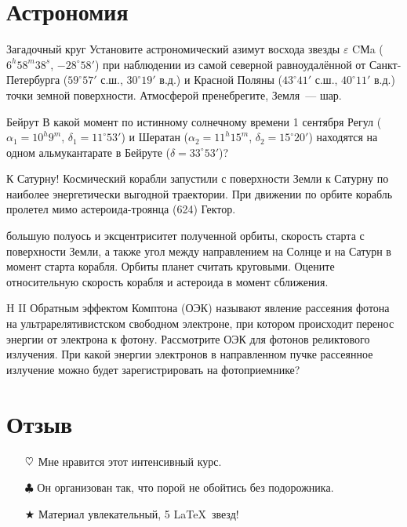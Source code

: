 \documentclass[11pt]{article}
\newcommand{\heart}{\ensuremath\heartsuit}
\begin{document}
\section{Астрономия}
\begin{astro}{Загадочный круг}
Установите астрономический азимут восхода звезды $\varepsilon$ CМa ($6^h58^m38^s$, $-28^\circ58'$) при наблюдении из самой северной равноудалённой от Санкт-Петербурга ($59^\circ57'$ с.ш., $30^\circ19'$ в.д.) и Красной Поляны ($43^\circ41'$ с.ш., $40^\circ11'$ в.д.) точки земной поверхности. Атмосферой пренебрегите, Земля~--- шар.
\end{astro}
\begin{astro}{Бейрут}
В какой момент по истинному солнечному времени 1 сентября Регул ($\alpha_1 = 10^h9^m$, $\delta_1 = 11^\circ53'$) и Шератан ($\alpha_2 = 11^h15^m$, $\delta_2 = 15^\circ20'$) находятся на одном альмукантарате в Бейруте ($\delta = 33^\circ53'$)?
\\
\end{astro}
\begin{astro}{К Сатурну!}
Космический корабли запустили с поверхности Земли к Сатурну по наиболее энергетически выгодной траектории. При движении по орбите корабль пролетел мимо астероида-троянца (624) Гектор.

 большую полуось и эксцентриситет полученной орбиты, скорость старта с поверхности Земли, а также угол между направлением на Солнце и на Сатурн в момент старта корабля. Орбиты планет считать круговыми. Оцените относительную скорость корабля и астероида в момент сближения.
\\
\end{astro}
\begin{astro}{H II}
Обратным эффектом Комптона (ОЭК) называют явление рассеяния фотона на ультрарелятивистском свободном электроне, при котором происходит перенос энергии от электрона к фотону.  Рассмотрите ОЭК для фотонов реликтового излучения. При какой энергии электронов в направленном пучке рассеянное излучение можно будет зарегистрировать на фотоприемнике?
\end{astro}
\section{Отзыв}
\begin{itemize}
\item[$\heart$] Мне нравится этот интенсивный курс.
\item[$\clubsuit$] Он организован так, что порой не обойтись без подорожника.
\item[$\bigstar$] Материал увлекательный, 5 \LaTeX ~звезд!
\end{itemize}
\end{document}
